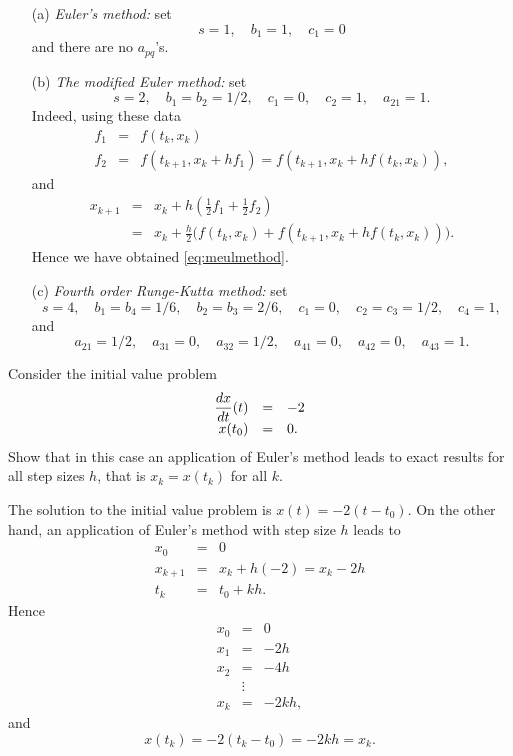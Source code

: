 \documentclass{ximera}
\begin{document}
\begin{itemize}
\item[(a)] {\em Euler's method:} 
set
\[
s=1,\quad b_1=1,\quad c_1=0 
\]
and there are no $a_{pq}$'s.
\item[(b)] {\em The modified Euler method:} 
 set
\[
s=2,\quad b_1=b_2=1/2,\quad c_1=0,\quad c_2=1,\quad a_{21}=1.
\]
Indeed, using these data
\begin{eqnarray*}
f_1 &=& f(t_k,x_k)\\
f_2 &=& f(t_{k+1},x_k+hf_1)=f(t_{k+1},x_k+hf(t_k,x_k)),
\end{eqnarray*}
and
\begin{eqnarray*}
x_{k+1} &=& x_k + h \left(\frac{1}{2}f_1 + \frac{1}{2}f_2\right)\\
&=& x_k + \frac{h}{2}
\Big( f(t_k, x_k)+f(t_{k+1}, x_k + h f(t_k, x_k))\Big).
\end{eqnarray*}
Hence we have obtained \eqref{eq:meulmethod}.
\item[(c)] {\em Fourth order Runge-Kutta method:} 
set 
\[
s=4,\quad b_1=b_4=1/6,\quad b_2=b_3=2/6,\quad 
c_1=0,\quad c_2=c_3=1/2,\quad c_4=1,
\]
and 
\[
a_{21}=1/2,\quad a_{31}=0,\quad a_{32}=1/2,\quad
a_{41}=0,\quad a_{42}=0,\quad a_{43}=1.
\]
\end{itemize}


\EXER

\TEXER

\begin{exercise} \label{c15.1.1}
Consider the initial value problem
\[
\begin{array}{rcl}
\displaystyle\frac{dx}{dt}(t) & = & -2 \\
x(t_0) & = & 0.
\end{array}
\]
Show that in this case an application of Euler's method 
leads to exact results for all step sizes $h$,
that is $x_k=x(t_k)$ for all $k$.

\begin{solution}
The solution to the initial value problem is
$x(t)=-2(t-t_0)$.  On the other hand, an application of Euler's method
with step size $h$ leads to
\[
\begin{array}{rcl}
x_0 & = & 0 \\
x_{k+1} & = & x_k + h (-2) = x_k - 2h\\
t_k & = & t_0 + kh.
\end{array}
\]
Hence
\[
\begin{array}{rcl}
x_0 & = & 0\\
x_1 & = & -2h\\
x_2 & = & -4h\\
 & \vdots & \\
x_k & = & -2kh,
\end{array}
\]
and
\[
x(t_k) = -2(t_k-t_0) = -2kh = x_k.
\]

\end{solution}
\end{exercise}
\end{document}
